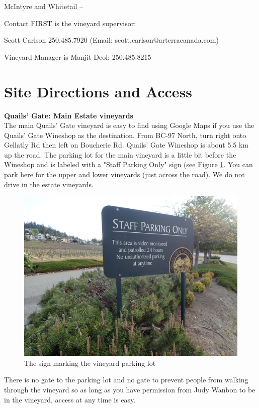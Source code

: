 \documentclass[11pt,letter]{article}
\begin{document}
McIntyre and Whitetail -- 

Contact FIRST is the vineyard supervisor:

Scott Carlson 250.485.7920 (Email: scott.carlson@arterracanada.com)

Vineyard Manager is Manjit Deol: 250.485.8215


\section{Site Directions and Access}

{\bf Quails' Gate: Main Estate vineyards} \\
The main Quails' Gate vineyard is easy to find using Google Maps if you use the Quails' Gate Wineshop as the destination. 
From BC-97 North, turn right onto Gellatly Rd then left on Boucherie Rd. Quails' Gate Wineshop is about 5.5 km up the road. The parking lot for the main vineyard is a little bit before the Wineshop and is labeled with a "Staff Parking Only" sign (see Figure \ref{fig:QGparkingLot}. You can park here for the upper and lower vineyards (just across the road). We do not drive in the estate vineyards.

\begin{figure} [h]
  \includegraphics[scale = .25]{qgParkingLot.JPG}
  \caption{The sign marking the vineyard parking lot }
  \label{fig:QGparkingLot}
\end{figure}

There is no gate to the parking lot and no gate to prevent people from walking through the vineyard so as long as you have permission from Judy Wanbon to be in the vineyard, access at any time is easy. \\
\end{document}
